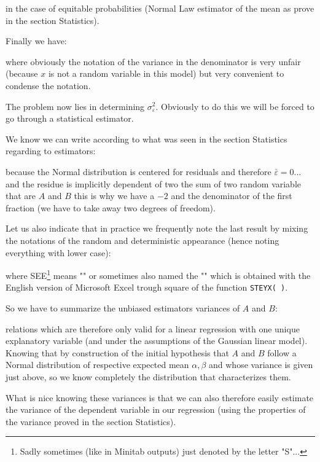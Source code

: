 	in the case of equitable probabilities (Normal Law estimator of the mean as prove in the section Statistics).
	
	Finally we have:
	
	where obviously the notation of the variance in the denominator is very unfair (because $x$ is not a random variable in this model) but very convenient to condense the notation.
	
	The problem now lies in determining $\sigma_\varepsilon^2$. Obviously to do this we will be forced to go through a statistical estimator.
	
	We know we can write according to what was seen in the section Statistics regarding to estimators:
	
	because the Normal distribution is centered for residuals and therefore $\bar{\varepsilon}=0$... and the residue is implicitly dependent of two the sum of two random variable that are $A$ and $B$ this is why we have a $-2$ and the denominator of the first fraction (we have to take away two degrees of freedom).
	
	Let us also indicate that in practice we frequently note the last result by mixing the notations of the random and deterministic appearance (hence noting everything with lower case):
	
	where SEE\footnote{Sadly sometimes (like in Minitab outputs) just denoted by the letter "S"...} means "\label{standard error of estimate}" or sometimes also named  the "" which is obtained with the English version of Microsoft Excel trough square of the function \texttt{STEYX( )}.
	
	So we have to summarize the unbiased estimators variances of $A$ and $B$:
	
	relations which are therefore only valid for a linear regression with one unique explanatory variable (and under the assumptions of the Gaussian linear model). Knowing that by construction of the initial hypothesis that $A$ and $B$ follow a Normal distribution of respective expected mean $\alpha,\beta$ and whose variance is given just above, so we know completely the distribution that characterizes them.
	
	What is nice knowing these variances is that we can also therefore easily estimate the variance of the dependent variable in our regression (using the properties of the variance proved in the section Statistics).
	
